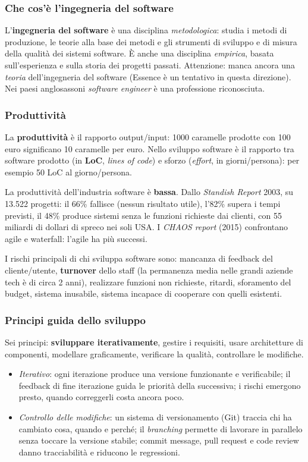 \documentclass[a4paper,12pt]{article}
\begin{document}
\subsubsection{Che cos'è l'ingegneria del software}
L'\textbf{ingegneria del software} è una disciplina \emph{metodologica}: studia i metodi di
produzione, le teorie alla base dei metodi e gli strumenti di sviluppo e di misura della
qualità dei sistemi software. È anche una disciplina \emph{empirica}, basata
sull'esperienza e sulla storia dei progetti passati. Attenzione: manca ancora una
\emph{teoria} dell'ingegneria del software (Essence è un tentativo in questa direzione).
Nei paesi anglosassoni \emph{software engineer} è una professione riconosciuta.

\subsubsection{Produttività}
La \textbf{produttività} è il rapporto output/input: 1000 caramelle prodotte con 100 euro
significano 10 caramelle per euro. Nello sviluppo software è il rapporto tra software
prodotto (in \textbf{LoC}, \emph{lines of code}) e sforzo (\emph{effort}, in giorni/persona):
per esempio 50 LoC al giorno/persona.

La produttività dell'industria software è \textbf{bassa}. Dallo \emph{Standish Report} 2003,
su 13.522 progetti: il 66\% fallisce (nessun risultato utile), l'82\% supera i tempi
previsti, il 48\% produce sistemi senza le funzioni richieste dai clienti, con 55 miliardi
di dollari di spreco nei soli USA. I \emph{CHAOS report} (2015) confrontano agile e
waterfall: l'agile ha più successi.

I rischi principali di chi sviluppa software sono: mancanza di feedback del
cliente/utente, \textbf{turnover} dello staff (la permanenza media nelle grandi aziende
tech è di circa 2 anni), realizzare funzioni non richieste, ritardi, sforamento del
budget, sistema inusabile, sistema incapace di cooperare con quelli esistenti.

\subsubsection{Principi guida dello sviluppo}
Sei principi: \textbf{sviluppare iterativamente}, gestire i requisiti, usare architetture
di componenti, modellare graficamente, verificare la qualità, controllare le modifiche.
\begin{itemize}
  \item \emph{Iterativo}: ogni iterazione produce una versione funzionante e verificabile;
        il feedback di fine iterazione guida le priorità della successiva; i rischi
        emergono presto, quando correggerli costa ancora poco.
  \item \emph{Controllo delle modifiche}: un sistema di versionamento (Git) traccia chi ha
        cambiato cosa, quando e perché; il \emph{branching} permette di lavorare in
        parallelo senza toccare la versione stabile; commit message, pull request e code
        review danno tracciabilità e riducono le regressioni.
\end{itemize}
\end{document}
